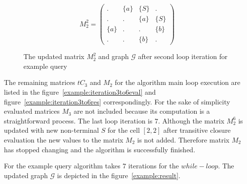 \begin{figure}
    \begin{subfigure}[]{0.5\textwidth}
    \centering
    $$
    M_2^2 =
    \begin{pmatrix}
    .     & \{a\} & \{S\} & .     \\
    .     & .     & \{a\} & \{S\} \\
    \{a\} & .     & .     & \{b\} \\
    .     & .     & \{b\} & . 
    \end{pmatrix}
    $$
    \end{subfigure}
    \begin{subfigure}[]{0.4\textwidth}
    \centering
    \end{subfigure}
    \caption{The updated matrix $M_2^2$ and graph $\mathcal{G}$ after second loop iteration for example query}
    \label{example:iteration2res}
\end{figure}

The remaining matrices $tC_3$ and $M_2$ for the algorithm main loop execution are listed in the figure~\ref{example:iteration3to6eval} and figure~\ref{example:iteration3to6res} correspondingly. For the sake of simplicity evaluated matrices $M_3$ are not included because its computation is a straightforward process. The last loop iteration is $7$. Although the matrix $M_2^6$ is updated with new non-terminal $S$ for the cell $[2,2]$ after transitive closure evaluation the new values to the matrix $M_2$ is not added. Therefore matrix $M_2$ has stopped changing and the algorithm is successfully finished. 

For the example query algorithm takes $7$ iterations for the $while-loop$. The updated graph $\mathcal{G}$ is depicted in the figure~\ref{example:result}.

